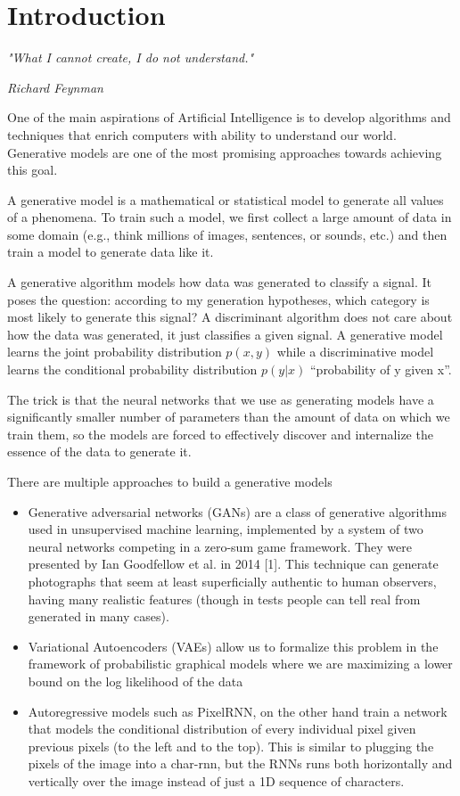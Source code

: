 \chapter{Introduction}\label{ch:introduction}

\epigraph{\textit{\Large "What I cannot create, I do not understand."}}{\textit{ \Large Richard Feynman}}
One of the main aspirations of Artificial Intelligence is to develop algorithms and techniques that enrich computers with ability to understand our world. Generative models are one of the most promising approaches towards achieving this goal.\par\bigskip
A generative model is a mathematical or statistical model to generate all values of a phenomena. To train such a model, we first collect a large amount of data in some domain (e.g., think millions of images, sentences, or sounds, etc.) and then train a model to generate data like it.\par\bigskip
A generative algorithm models how data was generated to classify a signal. It poses the question: according to my generation hypotheses, which category is most likely to generate this signal? A discriminant algorithm does not care about how the data was generated, it just classifies a given signal. A generative model learns the joint probability distribution $p(x,y)$ while a discriminative model learns the conditional probability distribution $p(y|x)$ “probability of y given x”.\par\bigskip
The trick is that the neural networks that we use as generating models have a significantly smaller number of parameters than the amount of data on which we train them, so the models are forced to effectively discover and internalize the essence of the data to generate it.\par\bigskip
There are multiple approaches to build a generative models
\begin{itemize}
  \item Generative adversarial networks (GANs) are a class of generative algorithms used in unsupervised machine learning, implemented by a system of two neural networks competing in a zero-sum game framework. They were presented by Ian Goodfellow et al. in 2014 [1]. This technique can generate photographs that seem at least superficially authentic to human observers, having many realistic features (though in tests people can tell real from generated in many cases).
  \item Variational Autoencoders (VAEs) allow us to formalize this problem in the framework of probabilistic graphical models where we are maximizing a lower bound on the log likelihood of the data
  \item Autoregressive models such as PixelRNN, on the other hand train a network that models the conditional distribution of every individual pixel given previous pixels (to the left and to the top). This is similar to plugging the pixels of the image into a char-rnn, but the RNNs runs both horizontally and vertically over the image instead of just a 1D sequence of characters.
\end{itemize} \par
